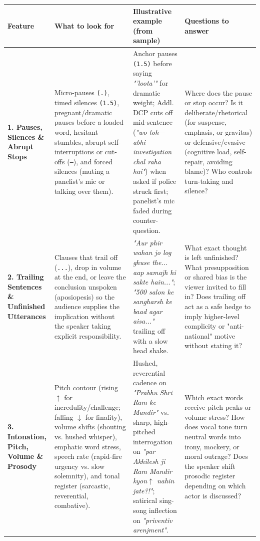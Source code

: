 \documentclass[10pt,a4paper]{article}
\begin{document}
\begin{longtable}{|p{}|p{}|p{}|p{}|}
\hline
Feature & What to look for & Illustrative example (from sample) & Questions to answer \\ \hline \endhead
\textbf{1. Pauses, Silences \& Abrupt Stops} & Micro-pauses \texttt{(.)}, timed silences \texttt{(1.5)}, pregnant/dramatic pauses before a loaded word, hesitant stumbles, abrupt self-interruptions or cut-offs (\texttt{---}), and forced silences (muting a panelist's mic or talking over them). & Anchor pauses \texttt{(1.5)} before saying \textit{"'loota'"} for dramatic weight; Addl. DCP cuts off mid-sentence (\textit{"wo toh--- abhi investigation chal raha hai"}) when asked if police struck first; panelist's mic faded during counter-question. & Where does the pause or stop occur? Is it deliberate/rhetorical (for suspense, emphasis, or gravitas) or defensive/evasive (cognitive load, self-repair, avoiding blame)? Who controls turn-taking and silence? \\ \hline
\textbf{2. Trailing Sentences \& Unfinished Utterances} & Clauses that trail off (\texttt{...}), drop in volume at the end, or leave the conclusion unspoken (aposiopesis) so the audience supplies the implication without the speaker taking explicit responsibility. & \textit{"Aur phir wahan jo log ghuse the... aap samajh hi sakte hain..."}; \textit{"500 salon ke sangharsh ke baad agar aisa..."} trailing off with a slow head shake. & What exact thought is left unfinished? What presupposition or shared bias is the viewer invited to fill in? Does trailing off act as a safe hedge to imply higher-level complicity or "anti-national" motive without stating it? \\ \hline
\textbf{3. Intonation, Pitch, Volume \& Prosody} & Pitch contour (rising \texttt{$\uparrow$} for incredulity/challenge; falling \texttt{$\downarrow$} for finality), volume shifts (shouting vs. hushed whisper), emphatic word stress, speech rate (rapid-fire urgency vs. slow solemnity), and tonal register (sarcastic, reverential, combative). & Hushed, reverential cadence on \textit{"Prabhu Shri Ram ke Mandir"} vs. sharp, high-pitched interrogation on \textit{"par Akhilesh ji Ram Mandir kyon$\uparrow$ nahin jate?!"}; satirical sing-song inflection on \textit{"priventiv arenjment"}. & Which exact words receive pitch peaks or volume stress? How does vocal tone turn neutral words into irony, mockery, or moral outrage? Does the speaker shift prosodic register depending on which actor is discussed? \\ \hline

\end{longtable}
\end{document}
